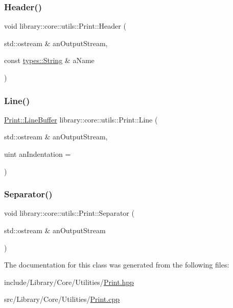 \subsubsection{\texorpdfstring{Header()}{Header()}}
{\footnotesize\ttfamily void library\+::core\+::utils\+::\+Print\+::\+Header (\begin{DoxyParamCaption}\item[{std\+::ostream \&}]{an\+Output\+Stream,  }\item[{const \hyperlink{classlibrary_1_1core_1_1types_1_1_string}{types\+::\+String} \&}]{a\+Name }\end{DoxyParamCaption})\hspace{0.3cm}{\ttfamily [static]}}

\mbox{\label{classlibrary_1_1core_1_1utils_1_1_print_ab4d98c65fbb58213358df534dd1f6d65}} 
\subsubsection{\texorpdfstring{Line()}{Line()}}
{\footnotesize\ttfamily \hyperlink{classlibrary_1_1core_1_1utils_1_1_print_1_1_line_buffer}{Print\+::\+Line\+Buffer} library\+::core\+::utils\+::\+Print\+::\+Line (\begin{DoxyParamCaption}\item[{std\+::ostream \&}]{an\+Output\+Stream,  }\item[{uint}]{an\+Indentation = {} }\end{DoxyParamCaption})\hspace{0.3cm}{\ttfamily [static]}}

\mbox{\label{classlibrary_1_1core_1_1utils_1_1_print_a58361390194e28388d3ac0ec0910cc0c}} 
\subsubsection{\texorpdfstring{Separator()}{Separator()}}
{\footnotesize\ttfamily void library\+::core\+::utils\+::\+Print\+::\+Separator (\begin{DoxyParamCaption}\item[{std\+::ostream \&}]{an\+Output\+Stream }\end{DoxyParamCaption})\hspace{0.3cm}{\ttfamily [static]}}



The documentation for this class was generated from the following files\+:\begin{DoxyCompactItemize}
\item 
include/\+Library/\+Core/\+Utilities/\hyperlink{_print_8hpp}{Print.\+hpp}\item 
src/\+Library/\+Core/\+Utilities/\hyperlink{_print_8cpp}{Print.\+cpp}\end{DoxyCompactItemize}
